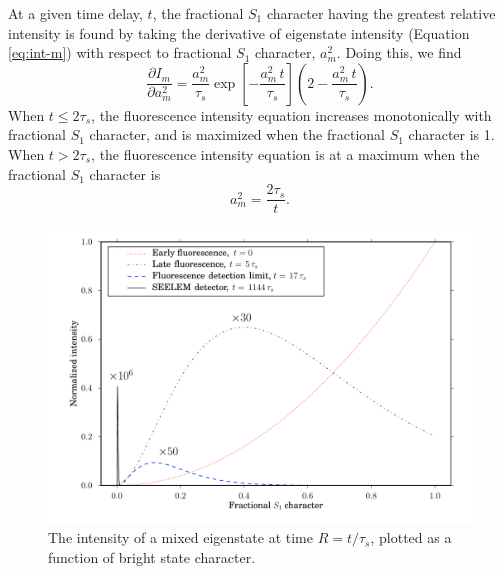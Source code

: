 \documentclass[12pt]{mitthesis}
\begin{document}
At a given time delay, $t$, the fractional $S_1$ character having the
greatest relative intensity is found by taking the derivative of
eigenstate intensity (Equation \ref{eq:int-m}) with respect to
fractional $S_1$ character, $a_m^2$.  Doing this, we find
\begin{equation}
 \frac{ \partial I_m }{ \partial a_m^2 } =
   \frac{a_m^2}{\tau_s}
   \exp \left[
     -\frac{a_m^2 \, t}{\tau_s} 
   \right]
   \left (
     2 - \frac{a_m^2 \, t}{\tau_s}
   \right ).
\end{equation}
When $t \leq 2\tau_s$, the fluorescence intensity equation increases
monotonically with fractional $S_1$ character, and is maximized
when the fractional $S_1$ character is 1.  When $t > 2 \tau_s$,
the fluorescence intensity equation is at a maximum when the
fractional $S_1$ character is
\begin{equation}
  \label{eq:am-max}
  a_m^2 = \frac{2 \tau_s}{t}.
\end{equation}

\begin{figure}
  \caption{The intensity of a mixed eigenstate at time $R =
    t/\tau_s$, plotted as a function of bright
    state character.}
  \label{fig:int-at-rc}
  \centering
  \includegraphics[width=7.5in,angle=90]{intensity-at-delay.pdf}
\end{figure}
\end{document}

